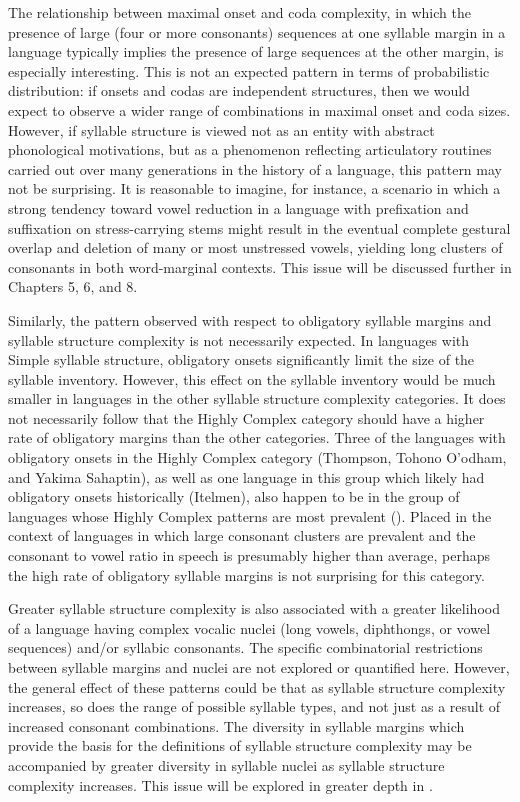   The relationship between maximal onset and coda complexity, in which the presence of large (four or more consonants) sequences at one syllable margin in a language typically implies the presence of large sequences at the other margin, is especially interesting. This is not an expected pattern in terms of probabilistic distribution: if onsets and codas are independent structures, then we would expect to observe a wider range of combinations in maximal onset and coda sizes. However, if syllable structure is viewed not as an entity with abstract phonological motivations, but as a phenomenon reflecting articulatory routines carried out over many generations in the history of a language, this pattern may not be surprising. It is reasonable to imagine, for instance, a scenario in which a strong tendency toward vowel reduction in a language with prefixation and suffixation on stress-carrying stems might result in the eventual complete gestural overlap and deletion of many or most unstressed vowels, yielding long clusters of consonants in both word-marginal contexts. This issue will be discussed further in Chapters 5, 6, and 8.

  Similarly, the pattern observed with respect to obligatory syllable margins and syllable structure complexity is not necessarily expected. In languages with Simple syllable structure, obligatory onsets significantly limit the size of the syllable inventory. However, this effect on the syllable inventory would be much smaller in languages in the other syllable structure complexity categories. It does not necessarily follow that the Highly Complex category should have a higher rate of obligatory margins than the other categories. Three of the languages with obligatory onsets in the Highly Complex category (Thompson, Tohono O’odham, and Yakima Sahaptin), as well as one language in this group which likely had obligatory onsets historically (Itelmen), also happen to be in the group of languages whose Highly Complex patterns are most prevalent (). Placed in the context of languages in which large consonant clusters are prevalent and the consonant to vowel ratio in speech is presumably higher than average, perhaps the high rate of obligatory syllable margins is not surprising for this category.

  Greater syllable structure complexity is also associated with a greater likelihood of a language having complex vocalic nuclei (long vowels, diphthongs, or vowel sequences) and/or syllabic consonants. The specific combinatorial restrictions between syllable margins and nuclei are not explored or quantified here. However, the general effect of these patterns could be that as syllable structure complexity increases, so does the range of possible syllable types, and not just as a result of increased consonant combinations. The diversity in syllable margins which provide the basis for the definitions of syllable structure complexity may be accompanied by greater diversity in syllable nuclei as syllable structure complexity increases. This issue will be explored in greater depth in .

